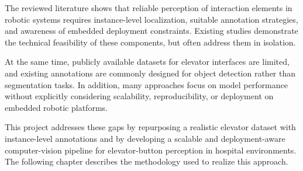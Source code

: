 The reviewed literature shows that reliable perception of interaction elements in
robotic systems requires instance-level localization, suitable annotation
strategies, and awareness of embedded deployment constraints. Existing studies
demonstrate the technical feasibility of these components, but often address them
in isolation.

At the same time, publicly available datasets for elevator interfaces are limited,
and existing annotations are commonly designed for object detection rather than segmentation tasks. In addition, many approaches focus
on model performance without explicitly considering scalability, reproducibility,
or deployment on embedded robotic platforms.

This project addresses these gaps by repurposing a realistic elevator dataset with
instance-level annotations and by developing a scalable and deployment-aware
computer-vision pipeline for elevator-button perception in hospital environments.
The following chapter describes the methodology used to realize this approach.
